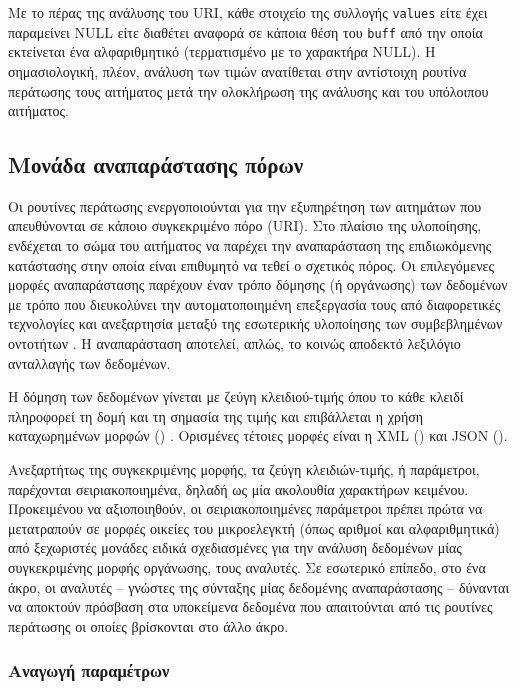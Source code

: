 Με το πέρας της ανάλυσης του URI, κάθε στοιχείο της συλλογής \verb~values~
είτε έχει παραμείνει NULL είτε διαθέτει αναφορά σε κάποια θέση του \verb~buff~
από την οποία εκτείνεται ένα αλφαριθμητικό (τερματισμένο με το χαρακτήρα NULL).
Η σημασιολογική, πλέον, ανάλυση των τιμών ανατίθεται
στην αντίστοιχη ρουτίνα περάτωσης τους αιτήματος μετά την ολοκλήρωση της
ανάλυσης και του υπόλοιπου αιτήματος.


\subsection{Μονάδα αναπαράστασης πόρων}
\label{subsec:network:representation}

Οι ρουτίνες περάτωσης ενεργοποιούνται για την εξυπηρέτηση των αιτημάτων που
απευθύνονται σε κάποιο συγκεκριμένο πόρο (URI). Στο πλαίσιο της υλοποίησης,
ενδέχεται το σώμα του αιτήματος να παρέχει την αναπαράσταση της επιδιωκόμενης
κατάστασης στην οποία είναι επιθυμητό να τεθεί ο σχετικός πόρος. Οι επιλεγόμενες
μορφές αναπαράστασης παρέχουν έναν τρόπο δόμησης (ή οργάνωσης) των δεδομένων με
τρόπο που διευκολύνει την αυτοματοποιημένη επεξεργασία τους από διαφορετικές
τεχνολογίες και ανεξαρτησία μεταξύ της εσωτερικής υλοποίησης των συμβεβλημένων
οντοτήτων \parencite[90--92]{fielding00}. Η αναπαράσταση αποτελεί, απλώς, το
κοινώς αποδεκτό λεξιλόγιο ανταλλαγής των δεδομένων.

Η δόμηση των δεδομένων γίνεται με ζεύγη κλειδιού-τιμής όπου το κάθε κλειδί
πληροφορεί τη δομή και τη σημασία της τιμής και επιβάλλεται η χρήση
καταχωρημένων μορφών () \parencite[90--92]{fielding00}. Ορισμένες
τέτοιες μορφές είναι η XML () και JSON
().

Ανεξαρτήτως της συγκεκριμένης μορφής, τα ζεύγη κλειδιών-τιμής, ή παράμετροι,
παρέχονται σειριακοποιημένα, δηλαδή ως μία ακολουθία χαρακτήρων κειμένου.
Προκειμένου να αξιοποιηθούν, οι σειριακοποιημένες παράμετροι πρέπει πρώτα να
μετατραπούν σε μορφές οικείες του μικροελεγκτή (όπως αριθμοί και αλφαριθμητικά)
από ξεχωριστές μονάδες ειδικά σχεδιασμένες για την ανάλυση δεδομένων μίας
συγκεκριμένης μορφής οργάνωσης, τους αναλυτές. Σε εσωτερικό επίπεδο, στο ένα
άκρο, οι αναλυτές -- γνώστες της σύνταξης μίας δεδομένης
αναπαράστασης -- δύνανται να αποκτούν πρόσβαση στα υποκείμενα δεδομένα που
απαιτούνται από τις ρουτίνες περάτωσης οι οποίες βρίσκονται στο άλλο άκρο.


\subsubsection{Αναγωγή παραμέτρων}

